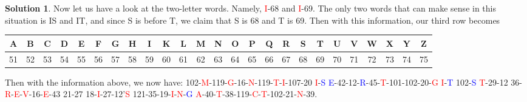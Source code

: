 \documentclass[11pt]{article}
\theoremstyle{definition}\newtheorem{definition}{Definition}
\theoremstyle{definition}\newtheorem{question}{Question}
\theoremstyle{definition}\newtheorem*{solution}{Solution}
\begin{document}
\begin{solution}
    Now let us have a look at the two-letter words. Namely, \textcolor{red}{I}-68 and \textcolor{red}{I}-69. The only two words that can make sense in this situation is IS and IT, and since S is before T, we claim that S is 68 and T is 69. Then with this information, our third row becomes
    \begin{center}\tiny\hspace*{-20pt}
        \begin{tabular}{ccccccccccccccccccccccccc} \hline
            A & B & C & D & E & F & G & H & I & K & L & M & N & O & P & Q & R & S & T & U & V & W & X & Y & Z \\ \hline
            51 & 52 & 53 & 54 & 55 & 56 & 57 & 58 & 59 & 60 & 61 & 62 & 63 & 64 & 65 & 66 & 67 & 68 & 69 & 70 & 71 & 72 & 73 & 74 & 75 \\ \hline
        \end{tabular}
    \end{center}
    Then with the information above, we now have: 102-\textcolor{red}{M}-119-\textcolor{red}{G}-16-\textcolor{red}{N}-119-\textcolor{red}{T}-\textcolor{red}{I}-107-20 \textcolor{red}{I}-\textcolor{blue}{S} \textcolor{blue}{E}-42-12-\textcolor{blue}{R}-45-\textcolor{red}{T}-101-102-20-\textcolor{red}{G} \textcolor{red}{I}-\textcolor{blue}{T} 102-\textcolor{blue}{S} \textcolor{red}{T}-29-12 36-\textcolor{red}{R}-\textcolor{red}{E}-\textcolor{red}{V}-16-\textcolor{red}{E}-43 21-27 18-\textcolor{red}{I}-27-12'\textcolor{red}{S} 121-35-19-\textcolor{red}{I}-\textcolor{red}{N}-\textcolor{blue}{G} \textcolor{red}{A}-40-\textcolor{red}{T}-38-119-\textcolor{red}{C}-\textcolor{red}{T}-102-21-\textcolor{red}{N}-39.


\end{solution}
\end{document}
